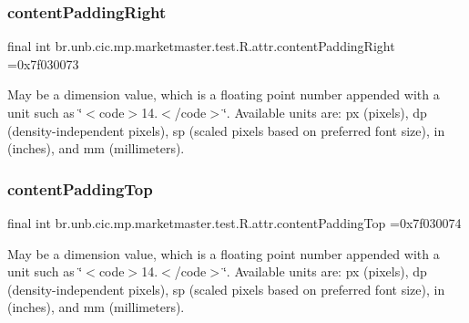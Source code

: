 \subsubsection{\texorpdfstring{content\+Padding\+Right}{contentPaddingRight}}
{\footnotesize\ttfamily final int br.\+unb.\+cic.\+mp.\+marketmaster.\+test.\+R.\+attr.\+content\+Padding\+Right =0x7f030073\hspace{0.3cm}{\ttfamily [static]}}

May be a dimension value, which is a floating point number appended with a unit such as \char`\"{}$<$code$>$14.\+5sp$<$/code$>$\char`\"{}. Available units are\+: px (pixels), dp (density-\/independent pixels), sp (scaled pixels based on preferred font size), in (inches), and mm (millimeters). \mbox{\label{classbr_1_1unb_1_1cic_1_1mp_1_1marketmaster_1_1test_1_1R_1_1attr_a38c5bd89639818bc0cccaf9fd1af6653}} 
\subsubsection{\texorpdfstring{content\+Padding\+Top}{contentPaddingTop}}
{\footnotesize\ttfamily final int br.\+unb.\+cic.\+mp.\+marketmaster.\+test.\+R.\+attr.\+content\+Padding\+Top =0x7f030074\hspace{0.3cm}{\ttfamily [static]}}

May be a dimension value, which is a floating point number appended with a unit such as \char`\"{}$<$code$>$14.\+5sp$<$/code$>$\char`\"{}. Available units are\+: px (pixels), dp (density-\/independent pixels), sp (scaled pixels based on preferred font size), in (inches), and mm (millimeters). \mbox{\label{classbr_1_1unb_1_1cic_1_1mp_1_1marketmaster_1_1test_1_1R_1_1attr_ae2de6f7df0ddbc7b6d49e7db5cddb5a9}} 
